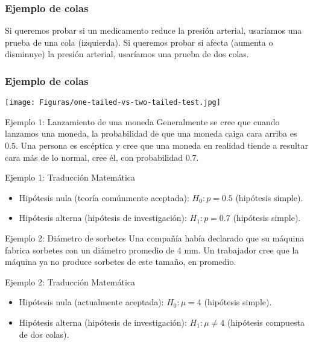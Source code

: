 \documentclass[aspectratio=169]{beamer}
\begin{document}
\begin{frame}
\frametitle{Ejemplo de colas}
Si queremos probar si un medicamento reduce la presión arterial, usaríamos una prueba de una cola (izquierda). Si queremos probar si afecta (aumenta o disminuye) la presión arterial, usaríamos una prueba de dos colas.
\end{frame}




\begin{frame}
\frametitle{Ejemplo de colas}
\begin{center}
\texttt{[image: Figuras/one-tailed-vs-two-tailed-test.jpg]} %
\end{center}
\end{frame}





\begin{frame}{Ejemplo 1: Lanzamiento de una moneda}
    Generalmente se cree que cuando lanzamos una moneda, la probabilidad de que una moneda caiga cara arriba es \(0.5\). Una persona es escéptica y cree que una moneda en realidad tiende a resultar cara más de lo normal, cree él, con probabilidad \(0.7\).
\end{frame}

\begin{frame}{Ejemplo 1: Traducción Matemática}
    \begin{itemize}
        \item Hipótesis nula (teoría comúnmente aceptada): \( H_0: p = 0.5 \) (hipótesis simple).
        \item Hipótesis alterna (hipótesis de investigación): \( H_1: p = 0.7 \) (hipótesis simple).
    \end{itemize}
\end{frame}

\begin{frame}{Ejemplo 2: Diámetro de sorbetes}
    Una compañía había declarado que su máquina fabrica sorbetes con un diámetro promedio de 4 mm. Un trabajador cree que la máquina ya no produce sorbetes de este tamaño, en promedio.
\end{frame}

\begin{frame}{Ejemplo 2: Traducción Matemática}
    \begin{itemize}
        \item Hipótesis nula (actualmente aceptada): \( H_0: \mu = 4 \) (hipótesis simple).
        \item Hipótesis alterna (hipótesis de investigación): \( H_1: \mu \neq 4 \) (hipótesis compuesta de dos colas).
    \end{itemize}
\end{frame}
\end{document}
